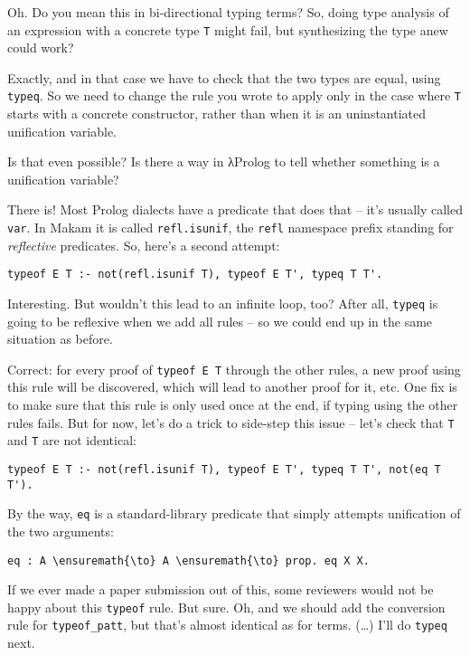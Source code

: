 \heroSTUDENT{} Oh. Do you mean this in bi-directional typing terms? So, doing
type analysis of an expression with a concrete type \texttt{T} might
fail, but synthesizing the type anew could work?

\heroADVISOR{} Exactly, and in that case we have to check that the two types
are equal, using \texttt{typeq}. So we need to change the rule you wrote
to apply only in the case where \texttt{T} starts with a concrete
constructor, rather than when it is an uninstantiated unification
variable.

\heroSTUDENT{} Is that even possible? Is there a way in \foreignlanguage{greek}{λ}Prolog to tell
whether something is a unification variable?

\heroADVISOR{} There is! Most Prolog dialects have a predicate that does that
-- it's usually called \texttt{var}. In Makam it is called
\texttt{refl.isunif}, the \texttt{refl} namespace prefix standing for
\emph{reflective} predicates. So, here's a second attempt:

\begin{verbatim}
typeof E T :- not(refl.isunif T), typeof E T', typeq T T'.
\end{verbatim}

\heroSTUDENT{} Interesting. But wouldn't this lead to an infinite loop, too?
After all, \texttt{typeq} is going to be reflexive when we add all rules
-- so we could end up in the same situation as before.

\heroADVISOR{} Correct: for every proof of
\texttt{typeof\ E\ T\textquotesingle{}} through the other rules, a new
proof using this rule will be discovered, which will lead to another
proof for it, etc. One fix is to make sure that this rule is only used
once at the end, if typing using the other rules fails. But for now,
let's do a trick to side-step this issue -- let's check that \texttt{T}
and \texttt{T\textquotesingle{}} are not identical:

\begin{verbatim}
typeof E T :- not(refl.isunif T), typeof E T', typeq T T', not(eq T T').
\end{verbatim}

By the way, \texttt{eq} is a standard-library predicate that simply
attempts unification of the two arguments:

\begin{verbatim}
eq : A \ensuremath{\to} A \ensuremath{\to} prop. eq X X.
\end{verbatim}

\heroSTUDENT{} If we ever made a paper submission out of this, some reviewers
would not be happy about this \texttt{typeof} rule. But sure. Oh, and we
should add the conversion rule for \texttt{typeof\_patt}, but that's
almost identical as for terms. (\ldots{}) I'll do \texttt{typeq} next.

